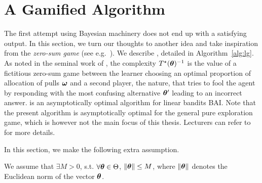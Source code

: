 \section{A Gamified Algorithm}\label{sec:lgc.game}

The first attempt using Bayesian machinery does not end up with a satisfying output. In this section, we turn our thoughts to another idea and take inspiration from the \emph{zero-sum game} (see e.g.~\citealt{degenne2019pure}). We describe \LG{}, detailed in Algorithm~\ref{alg:lg}. As noted in the seminal work of \citet{chernoff1959}, the complexity $T^{\star}({\boldsymbol \theta})^{-1}$ is the value of a fictitious zero-sum game between the learner choosing an optimal proportion of allocation of pulls ${\boldsymbol \omega}$ and a second player, the nature, that tries to fool the agent by responding with the most confusing alternative ${\boldsymbol \theta}'$ leading to an incorrect answer. \LG{} is an asymptotically optimal algorithm for linear bandits BAI. Note that the present algorithm is asymptotically optimal for the general pure exploration game, which is however not the main focus of this thesis. Lecturers can refer to~\cite{degenne2020game} for more details.

In this section, we make the following extra assumption.
\begin{assumption}\label{ass:lgc.bounded_parameter}
\begin{leftbar}[assumptionbar]
We assume that $\exists M>0$, s.t. $\forall {\boldsymbol \theta}\in\Theta$, $\left\lVert{\boldsymbol \theta}\right\rVert \leq M$, where $\left\lVert{\boldsymbol \theta}\right\rVert$ denotes the Euclidean norm of the vector ${\boldsymbol \theta}$. 
\end{leftbar}
\end{assumption}






